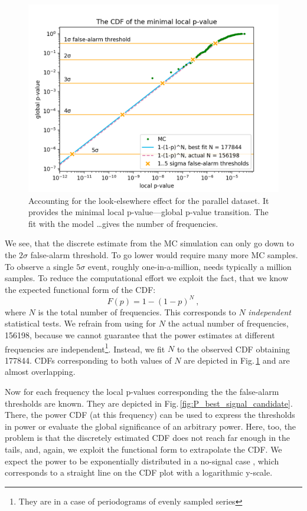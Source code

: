 \begin{figure}
  \centering
  \includegraphics[width=0.9\linewidth]{gfx/axions/P_look-elsewhere.png}
  \caption{Accounting for the look-elsewhere effect for the parallel dataset. It provides the minimal local p-value---global p-value transition. The fit with the model \dots gives the number of frequencies.}
  \label{fig:P_look-elsewhere}
\end{figure}

We see, that the discrete estimate from the MC simulation can only go down to the $2\sigma$ false-alarm threshold. To go lower would require many more MC samples. To observe a single $5\sigma$ event, roughly one-in-a-million, needs typically a million samples. To reduce the computational effort we exploit the fact, that we know the expected functional form of the CDF\@:
\begin{equation}
  F(p) = 1 - (1-p)^N\ ,
\end{equation}
where $N$ is the total number of frequencies. This corresponds to $N$ \emph{independent} statistical tests. We refrain from using for $N$ the actual number of frequencies, \num{156198}, because we cannot guarantee that the power estimates at different frequencies are independent\footnote{They are in a case of periodograms of evenly sampled series}. Instead, we fit $N$ to the observed CDF obtaining \num{177844}. CDFs corresponding to both values of $N$ are depicted in Fig.\,\ref{fig:P_look-elsewhere} and are almost overlapping.

Now for each frequency the local p-values corresponding the the false-alarm thresholds are known. They are depicted in Fig.\,\ref{fig:P_best_signal_candidate}. There, the power CDF (at this frequency) can be used to express the thresholds in power or evaluate the global significance of an arbitrary power. Here, too, the problem is that the discretely estimated CDF does not reach far enough in the tails, and, again, we exploit the functional form to extrapolate the CDF. We expect the power to be exponentially distributed in a no-signal case \cite{Scargle1982}, which corresponds to a straight line on the CDF plot with a logarithmic y-scale.

